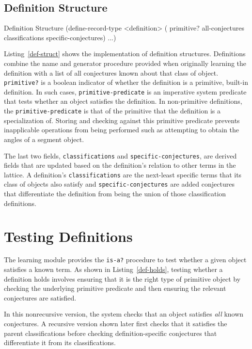 \subsection{Definition Structure}

\begin{code-listing}
[label=def-struct]
{Definition Structure}
(define-record-type <definition>
  (%
                     primitive?
                     all-conjectures
                     classifications specific-conjectures) ...)
\end{code-listing}

Listing~\ref{def-struct} shows the implementation of definition
structures. Definitions combine the name and generator procedure
provided when originally learning the definition with a list of all
conjectures known about that class of object. \texttt{primitive?} is a
boolean indicator of whether the definition is a primitive, built-in
definition. In such cases, \texttt{primitive-predicate} is an
imperative system predicate that tests whether an object satisfies the
definition. In non-primitive definitions, the
\texttt{primitive-predicate} is that of the primitive that the
definition is a specialization of. Storing and checking against this
primitive predicate prevents inapplicable operations from being
performed such as attempting to obtain the angles of a segment object.

The last two fields, \texttt{classifications} and
\texttt{specific-conjectures}, are derived fields that are updated
based on the definition's relation to other terms in the lattice. A
definition's \texttt{classifications} are the next-least specific
terms that its class of objects also satisfy and
\texttt{specific-conjectures} are added conjectures that differentiate
the definition from being the union of those classification
definitions.


\section{Testing Definitions}

The learning module provides the \texttt{is-a?} procedure to test
whether a given object satisfies a known term. As shown in
Listing~\ref{def-holds}, testing whether a definition holds involves
ensuring that it is the right type of primitive object by checking the
underlying primitive predicate and then ensuring the relevant
conjectures are satisfied.

In this nonrecursive version, the system checks that an object
satisfies \emph{all} known conjectures. A recursive version shown
later first checks that it satisfies the parent classifications before
checking definition-specific conjectures that differentiate it from
its classifications.


